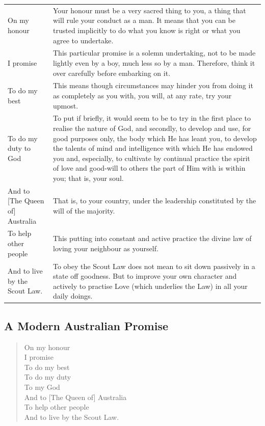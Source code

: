 \documentclass[11pt]{article}
\begin{document}
\begin{tabular}{ l p{8.5cm} }
  On my honour                     & Your honour must be a very sacred thing to you, a thing that will rule your conduct as a man. It means that you can be trusted implicitly to do what you know is right or what you agree to undertake.\\[3pt]
  I promise                        & This particular promise is a solemn undertaking, not to be made lightly even by a boy, much less so by a man. Therefore, think it over carefully before embarking on it.\\[3pt]
  To do my best                    & This means though circumstances may hinder you from doing it as completely as you with, you will, at any rate, try your upmost.\\[3pt]
  To do my duty to God             & To put if briefly, it would seem to be to try in the first place to realise the nature of God, and secondly, to develop and use, for good purposes only, the body which He has leant you, to develop the talents of mind and intelligence with which He has endowed you and, especially, to cultivate by continual practice the spirit of love and good-will to others the part of Him with is within you; that is, your soul.\\[3pt]
  And to [The Queen of] Australia  & That is, to your country, under the leadership constituted by the will of the majority.\\[3pt]
  To help other people             & This putting into constant and active practice the divine law of loving your neighbour as yourself.\\[3pt]
  And to live by the Scout Law.    & To obey the Scout Law does not mean to sit down passively in a state off goodness. But to improve your own character and actively to practise Love (which underlies the Law) in all your daily doings.\\
\end{tabular}

\subsection{A Modern Australian Promise}
\begin{verse}
  On my honour\\
  I promise\\
  To do my best\\
  To do my duty\\
  To my God\\
  And to [The Queen of] Australia\\
  To help other people\\
  And to live by the Scout Law.
\end{verse}
\end{document}
